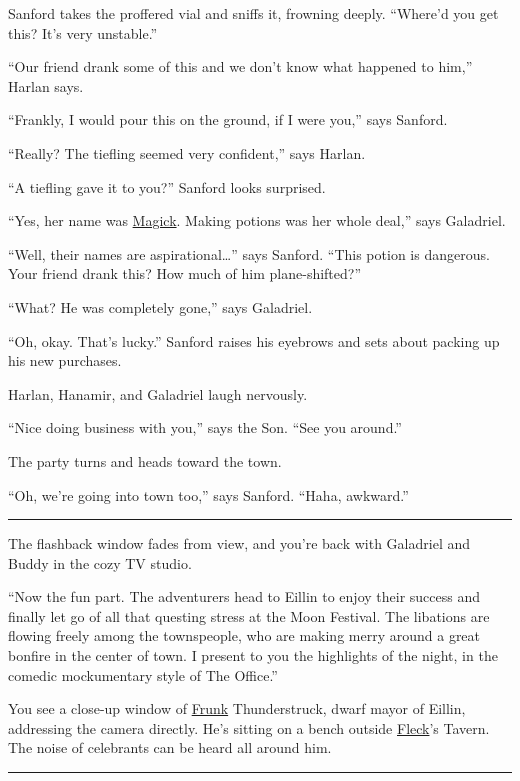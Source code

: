 \documentclass[smalldemyvopaper,11pt,twoside,onecolumn,openright,extrafontsizes]{memoir}
\begin{document}
Sanford takes the proffered vial and sniffs it, frowning deeply.
``Where'd you get this? It's very unstable.''

``Our friend drank some of this and we don't know what happened to
him,'' Harlan says.

``Frankly, I would pour this on the ground, if I were you,'' says
Sanford.

``Really? The tiefling seemed very confident,'' says Harlan.

``A tiefling gave it to you?'' Sanford looks surprised.

``Yes, her name was \href{/characters/magick/}{Magick}. Making potions
was her whole deal,'' says Galadriel.

``Well, their names are aspirational\ldots{}'' says Sanford. ``This
potion is dangerous. Your friend drank this? How much of him
plane-shifted?''

``What? He was completely gone,'' says Galadriel.

``Oh, okay. That's lucky.'' Sanford raises his eyebrows and sets about
packing up his new purchases.

Harlan, Hanamir, and Galadriel laugh nervously.

``Nice doing business with you,'' says the Son. ``See you around.''

The party turns and heads toward the town.

``Oh, we're going into town too,'' says Sanford. ``Haha, awkward.''

\begin{center}\rule{0.5\linewidth}{\linethickness}\end{center}

The flashback window fades from view, and you're back with Galadriel and
Buddy in the cozy TV studio.

``Now the fun part. The adventurers head to Eillin to enjoy their
success and finally let go of all that questing stress at the Moon
Festival. The libations are flowing freely among the townspeople, who
are making merry around a great bonfire in the center of town. I present
to you the highlights of the night, in the comedic mockumentary style of
The Office.''

You see a close-up window of \href{/characters/frunk/}{Frunk}
Thunderstruck, dwarf mayor of Eillin, addressing the camera directly.
He's sitting on a bench outside \href{/characters/fleck/}{Fleck}'s
Tavern. The noise of celebrants can be heard all around him.

\begin{center}\rule{0.5\linewidth}{\linethickness}\end{center}
\end{document}

